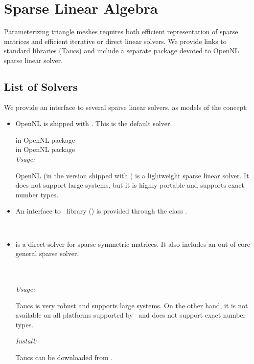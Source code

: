 \section{Sparse Linear Algebra \label{sec:Sparse-Linear-Algebra}}

Parameterizing triangle meshes requires both efficient representation
of sparse matrices and efficient iterative or direct linear
solvers. We provide links to standard libraries ({\sc Taucs})
and include a separate package devoted to OpenNL sparse linear solver.

\subsection{List of Solvers}

We provide an interface to several sparse linear solvers, as models
of the  concept:

\begin{itemize}

\item
    OpenNL \cite{cgal:l-nmdgp-05} is shipped with \cgal. This is the default solver.

     in OpenNL package  \\
     in OpenNL package  \\

    \emph{Usage:}

    OpenNL (in the version shipped with \cgal) is a lightweight sparse linear solver.
    It does not support large systems, but it is highly portable and
    supports exact number types.

\item
    An interface to \eigen\ library (\eigenpage) is provided through the class
    .
    
    \\


\item
    is a direct solver for sparse symmetric matrices.
    It also includes an out-of-core general sparse solver.

      \\
      \\

    \emph{Usage:}

    {\sc Taucs} is very robust and supports large systems.
    On the other hand, it is not available on all platforms
    supported by \cgal\ and does not support exact number types.

    \emph{Install:}

    {\sc Taucs} can be downloaded from
    {}.

\end{itemize}


